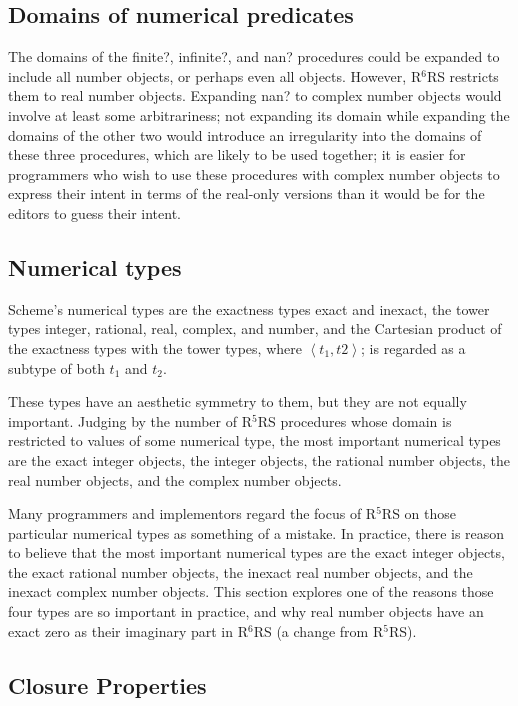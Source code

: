 \documentclass[twoside,twocolumn]{algol60}
\newcommand{\rn}[1]{R$^{#1}$RS}
\begin{document}
\subsection{Domains of numerical predicates}

The domains of the {\cf finite?}, {\cf infinite?}, and {\cf nan?}
procedures could be expanded to include all number objects, or perhaps even
all objects.  However, \rn{6} restricts them to real number objects.
Expanding {\cf nan?} to complex number objects would involve at least some
arbitrariness; not expanding its domain while expanding the domains of
the other two would introduce an irregularity into the domains of
these three procedures, which are likely to be used together; it is
easier for programmers who wish to use these procedures with complex
number objects to express their intent in terms of the real-only versions
than it would be for the editors to guess their intent.

\subsection{Numerical types}

Scheme's numerical types are the exactness types exact and inexact,
the tower types integer, rational, real, complex, and number, and the
Cartesian product of the exactness types with the tower types, where
$\left< t_1, t2 \right>$; is regarded as a subtype of both $t_1$ and
$t_2$.

These types have an aesthetic symmetry to them, but they are not
equally important.  Judging by the number of \rn{5} procedures whose
domain is restricted to values of some numerical type, the most
important numerical types are the exact integer objects, the integer objects, the
rational number objects, the real number objects, and the complex
number objects.

Many programmers and implementors regard the focus of \rn{5} on those
particular numerical types as something of a mistake.  In practice,
there is reason to believe that the most important numerical types are
the exact integer objects, the exact rational number objects, the
inexact real number objects, and the
inexact complex number objects.  This section explores one of the reasons
those four types are so important in practice, and why real number objects have an
exact zero as their imaginary part in \rn{6} (a change from \rn{5}).

\subsection{Closure Properties}
\label{closurepropertiessection}
\end{document}

